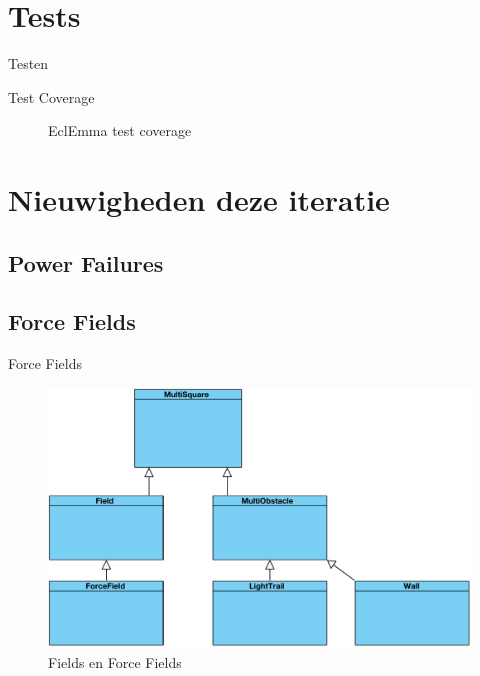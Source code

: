 \documentclass[t]{beamer}
\begin{document}
\section{Tests}

\begin{frame}{Testen}
\begin{multicols}{2}
\tableofcontents[currentsection]
\end{multicols}
\end{frame}

\begin{frame}{Test Coverage}
\begin{figure}[h!]
	\center
	\caption{EclEmma test coverage}
\end{figure}
\end{frame}

\section{Nieuwigheden deze iteratie}

\subsection{Power Failures}

\subsection{Force Fields}
\begin{frame}{Force Fields}
\begin{figure}
	\center
	\includegraphics[width= 0.6\linewidth]{img/forcefield.pdf}
	\caption{Fields en Force Fields}
\end{figure}
\end{frame}
\end{document}
